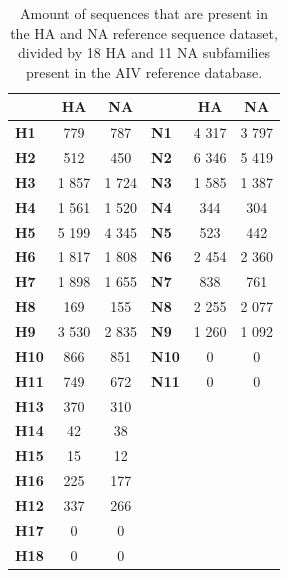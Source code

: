 \setlength{\tabcolsep}{16pt}
\renewcommand{\arraystretch}{1.3}
\begin{table}[ht!]
	\centering
	\begin{tabular}{@{}lcclcc@{}}
	\toprule
				 & \textbf{HA}  & \textbf{NA}  &              & \textbf{HA}  & \textbf{NA}  \\ \midrule
	\textbf{H1}  & 779          & 787          & \textbf{N1}  & 4 317        & 3 797        \\
	\textbf{H2}  & 512          & 450          & \textbf{N2}  & 6 346        & 5 419        \\
	\textbf{H3}  & 1 857        & 1 724        & \textbf{N3}  & 1 585        & 1 387        \\
	\textbf{H4}  & 1 561        & 1 520        & \textbf{N4}  & 344          & 304          \\
	\textbf{H5}  & 5 199        & 4 345        & \textbf{N5}  & 523          & 442          \\
	\textbf{H6}  & 1 817        & 1 808        & \textbf{N6}  & 2 454        & 2 360        \\
	\textbf{H7}  & 1 898        & 1 655        & \textbf{N7}  & 838          & 761          \\
	\textbf{H8}  & 169          & 155          & \textbf{N8}  & 2 255        & 2 077        \\
	\textbf{H9}  & 3 530        & 2 835        & \textbf{N9}  & 1 260        & 1 092        \\
	\textbf{H10} & 866          & 851          & \textbf{N10} & 0            & 0            \\
	\textbf{H11} & 749          & 672          & \textbf{N11} & 0            & 0            \\
	\textbf{H13} & 370          & 310          &              &              &              \\
	\textbf{H14} & 42           & 38           &              &              &              \\
	\textbf{H15} & 15           & 12           &              &              &              \\
	\textbf{H16} & 225          & 177          &              &              &              \\
	\textbf{H12} & 337          & 266          &              &              &              \\
	\textbf{H17} & 0            & 0            &              &              &              \\
	\textbf{H18} & 0            & 0            &              &              &              \\ \bottomrule
	\end{tabular}
	\caption[AIV reference collection by HA and NA subfamilies.]{Amount of sequences that are present in the HA and NA reference sequence dataset, divided by 18 HA and 11 NA subfamilies present in the AIV reference database.}
\label{tab:apx-aiv-ref-subtypes}
\end{table}

